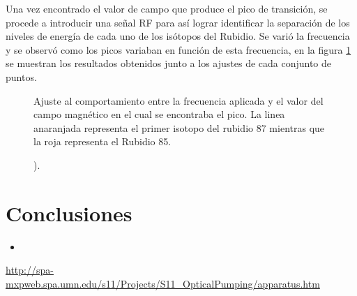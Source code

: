 \documentclass[%
 reprint,
 amsmath,amssymb,
 aps,
]{revtex4-1}
\begin{document}
Una vez encontrado el valor de campo que produce el pico de transición, se procede a introducir una señal RF para así lograr identificar la separación de los niveles de energía de cada uno de los isótopos del Rubidio. Se varió la frecuencia y se observó como los picos variaban en función de esta frecuencia, en la figura \ref{feq_corr} se muestran los resultados obtenidos junto a los ajustes de cada conjunto de puntos.
\begin{figure}[h]
\caption{\label{feq_corr} Ajuste al comportamiento entre la frecuencia aplicada y el valor del campo magnético en el cual se encontraba el pico. La linea anaranjada representa el primer isotopo del rubidio 87 mientras que la roja representa el Rubidio 85.}
\end{figure}
\begin{figure}[h]
\caption{\label{Volt_periodo} ).}
\end{figure}

\section{Conclusiones}
\begin{itemize}
    \item 
\end{itemize}

\begin{thebibliography}{9}
\url{http://spa-mxpweb.spa.umn.edu/s11/Projects/S11_OpticalPumping/apparatus.htm}

\end{thebibliography}
\end{document}
